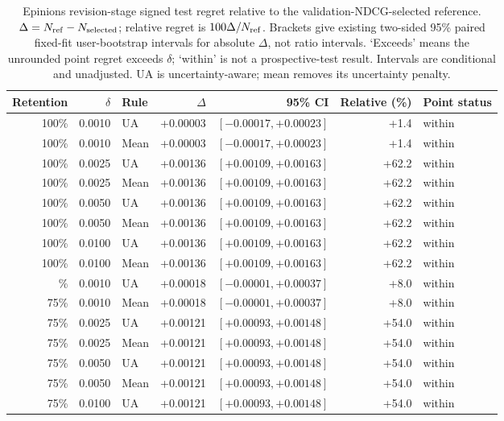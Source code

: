 \begin{table}[H]
\centering
\caption{Epinions revision-stage signed test regret relative to the validation-NDCG-selected reference. $\Delta=N_{\rm ref}-N_{\rm selected}$; relative regret is $100\Delta/N_{\rm ref}$. Brackets give existing two-sided 95\% paired fixed-fit user-bootstrap intervals for absolute $\Delta$, not ratio intervals. `Exceeds' means the unrounded point regret exceeds $\delta$; `within' is not a prospective-test result. Intervals are conditional and unadjusted. UA is uncertainty-aware; mean removes its uncertainty penalty.}
\label{tab:coverage-regret-epinions}
\small
\setlength{\tabcolsep}{4pt}
\begin{tabular}{@{}rrlrrrl@{}}
\toprule
Retention & $\delta$ & Rule & $\Delta$ & 95\% CI & Relative (\%) & Point status \\
\midrule
100\% & 0.0010 & UA & +0.00003 & $[-0.00017, +0.00023]$ & +1.4 & within \\
100\% & 0.0010 & Mean & +0.00003 & $[-0.00017, +0.00023]$ & +1.4 & within \\
100\% & 0.0025 & UA & +0.00136 & $[+0.00109, +0.00163]$ & +62.2 & within \\
100\% & 0.0025 & Mean & +0.00136 & $[+0.00109, +0.00163]$ & +62.2 & within \\
100\% & 0.0050 & UA & +0.00136 & $[+0.00109, +0.00163]$ & +62.2 & within \\
100\% & 0.0050 & Mean & +0.00136 & $[+0.00109, +0.00163]$ & +62.2 & within \\
100\% & 0.0100 & UA & +0.00136 & $[+0.00109, +0.00163]$ & +62.2 & within \\
100\% & 0.0100 & Mean & +0.00136 & $[+0.00109, +0.00163]$ & +62.2 & within \\
\addlinespace
75\% & 0.0010 & UA & +0.00018 & $[-0.00001, +0.00037]$ & +8.0 & within \\
75\% & 0.0010 & Mean & +0.00018 & $[-0.00001, +0.00037]$ & +8.0 & within \\
75\% & 0.0025 & UA & +0.00121 & $[+0.00093, +0.00148]$ & +54.0 & within \\
75\% & 0.0025 & Mean & +0.00121 & $[+0.00093, +0.00148]$ & +54.0 & within \\
75\% & 0.0050 & UA & +0.00121 & $[+0.00093, +0.00148]$ & +54.0 & within \\
75\% & 0.0050 & Mean & +0.00121 & $[+0.00093, +0.00148]$ & +54.0 & within \\
75\% & 0.0100 & UA & +0.00121 & $[+0.00093, +0.00148]$ & +54.0 & within \\

\end{tabular}
\end{table}
